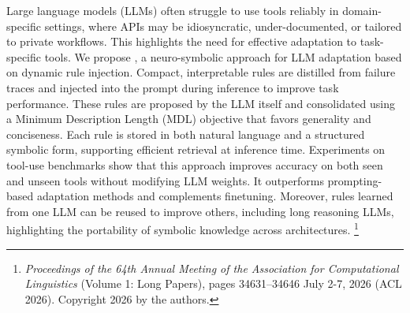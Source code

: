 Large language models (LLMs) often struggle to use tools reliably in domain-specific settings, where APIs may be idiosyncratic, under-documented, or tailored to private workflows. This highlights the need for effective adaptation to task-specific tools. We propose \shortname, a neuro-symbolic approach for LLM adaptation based on dynamic rule injection. Compact, interpretable rules are distilled from failure traces and injected into the prompt during inference to improve task performance. These rules are proposed by the LLM itself and consolidated using a Minimum Description Length (MDL) objective that favors generality and conciseness. Each rule is stored in both natural language and a structured symbolic form, supporting efficient retrieval at inference time. Experiments on tool-use benchmarks show that this approach improves accuracy on both seen and unseen tools without modifying LLM weights. It outperforms prompting-based adaptation methods and complements finetuning. Moreover, rules learned from one LLM can be reused to improve others, including long reasoning LLMs, highlighting the portability of symbolic knowledge across architectures.%
\footnote{\emph{Proceedings of the 64th Annual Meeting of the Association for Computational Linguistics} (Volume 1: Long Papers), pages 34631–34646
July 2-7, 2026 (ACL 2026). Copyright 2026
by the authors.}


